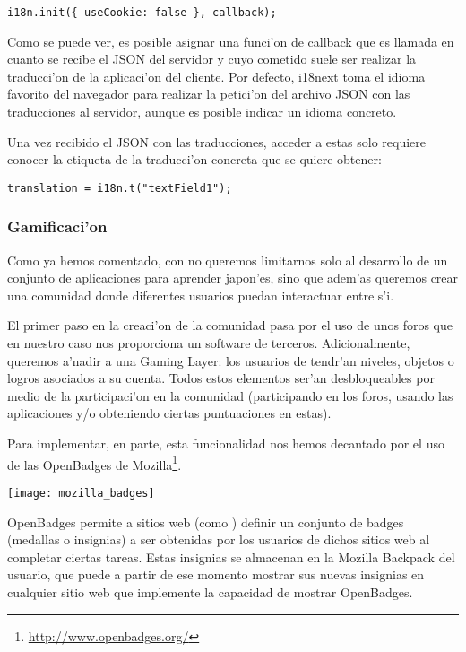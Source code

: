 \begin{verbatim}
i18n.init({ useCookie: false }, callback);
\end{verbatim}

Como se puede ver, es posible asignar una funci'on de callback que es llamada en cuanto se recibe el JSON del
servidor y cuyo cometido suele ser realizar la traducci'on de la aplicaci'on del cliente.
Por defecto, i18next toma el idioma favorito del navegador para realizar la petici'on del archivo JSON con las
traducciones al servidor, aunque es posible indicar un idioma concreto.

Una vez recibido el JSON con las traducciones, acceder a estas solo requiere conocer la etiqueta de la traducci'on
concreta que se quiere obtener:

\begin{verbatim}
translation = i18n.t("textField1");
\end{verbatim}

\subsubsection{Gamificaci'on}
\label{sub:gamificacion}

Como ya hemos comentado, con \Nipponline{} no queremos limitarnos solo al desarrollo de un conjunto de aplicaciones para
aprender japon'es, sino que adem'as queremos crear una comunidad donde diferentes usuarios puedan interactuar entre
s'i.

El primer paso en la creaci'on de la comunidad pasa por el uso de unos foros que en nuestro caso nos proporciona un
software de terceros. 
Adicionalmente, queremos a'nadir a \Nipponline{} una Gaming Layer: los usuarios de \Nipponline{} tendr'an niveles, objetos
o logros asociados a su cuenta. Todos estos elementos ser'an desbloqueables por medio de la participaci'on en la
comunidad (participando en los foros, usando las aplicaciones y/o obteniendo ciertas puntuaciones en estas).

Para implementar, en parte, esta funcionalidad nos hemos decantado por el uso de las OpenBadges de 
Mozilla\footnote{\url{http://www.openbadges.org/}}.

\begin{center}
\texttt{[image: mozilla\_badges]}
\end{center}

OpenBadges permite a sitios web (como \Nipponline{}) definir un conjunto de badges (medallas o insignias) a ser 
obtenidas por los usuarios de dichos sitios web al completar ciertas tareas. Estas insignias se almacenan en la
Mozilla Backpack del usuario, que puede a partir de ese momento mostrar sus nuevas insignias en cualquier sitio web
que implemente la capacidad de mostrar OpenBadges. 

